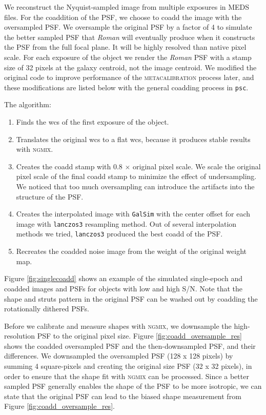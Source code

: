 \documentclass[fleqn,usenatbib]{mnras}
\begin{document}
We reconstruct the Nyquist-sampled image from multiple exposures in MEDS files. For the coaddition of the PSF, we choose to coadd the image with the oversampled PSF. We oversample the original PSF by a factor of 4 to simulate the better sampled PSF that \emph{Roman} will eventually produce when it constructs the PSF from the full focal plane. It will be highly resolved than native pixel scale. For each exposure of the object we render the \emph{Roman} PSF with a stamp size of 32 pixels at the galaxy centroid, not the image centroid. We modified the original code to improve performance of the \textsc{metacalibration} process later, and these modifications are listed below with the general coadding process in \texttt{psc}. 

The algorithm: 
\begin{enumerate}
    \setlength\itemsep{1em}
    \item Finds the wcs of the first exposure of the object.
    \item Translates the original wcs to a flat wcs, because it produces stable results with \textsc{ngmix}.
    \item Creates the coadd stamp with 0.8 $\times$ original pixel scale. We scale the original pixel scale of the final coadd stamp to minimize the effect of undersampling. We noticed that too much oversampling can introduce the artifacts into the structure of the PSF. 
    \item Creates the interpolated image with \texttt{GalSim} with the center offset for each image with \texttt{lanczos3} resampling method. Out of several interpolation methods we tried, \texttt{lanczos3} produced the best coadd of the PSF.
    \item Recreates the coadded noise image from the weight of the original weight map.
\end{enumerate}


Figure \ref{fig:singlecoadd} shows an example of the simulated single-epoch and coadded images and PSFs for objects with low and high S/N. Note that the shape and struts pattern in the original PSF can be washed out by coadding the rotationally dithered PSFs. 


Before we calibrate and measure shapes with \textsc{ngmix}, we downsample the high-resolution PSF to the original pixel size. Figure \ref{fig:coadd_oversample_res} shows the coadded oversampled PSF and the then-downsampled PSF, and their differences. We downsampled the oversampled PSF (128 x 128 pixels) by summing 4 square-pixels and creating the original size PSF (32 x 32 pixels), in order to ensure that the shape fit with \textsc{ngmix} can be processed. Since a better sampled PSF generally enables the shape of the PSF to be more isotropic, we can state that the original PSF can lead to the biased shape measurement from Figure \ref{fig:coadd_oversample_res}. 
\end{document}
